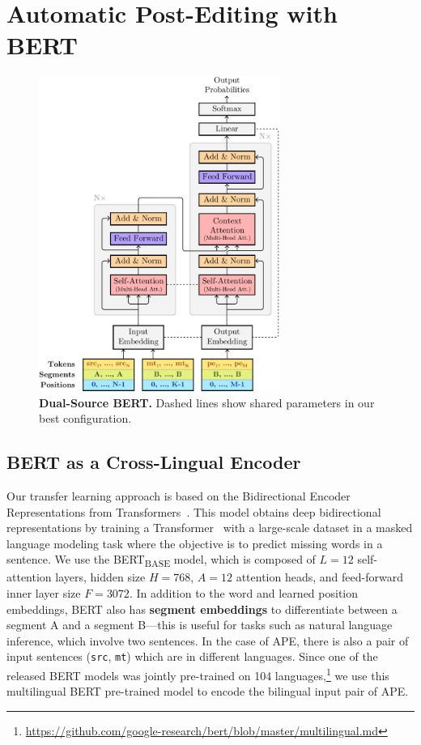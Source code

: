 \section{Automatic Post-Editing with BERT}\label{sec:ape_bert}

\begin{figure}[t]
  \centering
  \includegraphics[width=0.7\textwidth]{Figures/bert-ape-diagram.pdf}
  \caption{\textbf{Dual-Source BERT.}
    Dashed lines show shared parameters in our best configuration.}
  \label{fig:transformer_diagram}
\end{figure}

\subsection{BERT as a Cross-Lingual Encoder}

Our transfer learning approach is based on the Bidirectional Encoder
Representations from Transformers~\citep[BERT;][]{devlin2018bert}.
This model obtains deep bidirectional representations by training a
Transformer~\citep{vaswani2017attention} with a large-scale dataset
in a masked language modeling task where the objective is to predict
missing words in a sentence. We use the BERT\textsubscript{BASE}
model, which is composed of $L=12$ self-attention layers, hidden size
$H=768$, $A=12$ attention heads, and feed-forward inner layer size
$F=3072$. In addition to the word and learned position embeddings,
BERT also has {\bf segment embeddings} to differentiate between a
segment A and a segment B---this is useful for tasks such as natural
language inference, which involve two sentences. In the case of APE,
there is also a pair of input sentences ({\tt src}, {\tt mt}) which
are in different languages. Since one of the released BERT models was
jointly pre-trained on 104 languages,\footnote{
  \url{https://github.com/google-research/bert/blob/master/multilingual.md}}
we use this multilingual BERT pre-trained model to encode the
bilingual input pair of APE.

